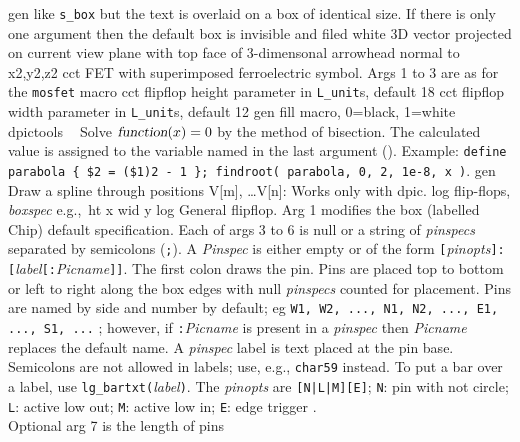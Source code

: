 %

%
  {gen}%
  {like {\tt s\_box} but the text is overlaid on a box of identical size.
   If there is only one argument then the default box
   is invisible and filed white
    }%
%
  {3D}%
  {vector projected on current view plane with top face
   of 3-dimensonal arrowhead normal to x2,y2,z2 }%
%
  {cct}%
  {FET with superimposed ferroelectric symbol. Args 1 to 3 are as for
   the {\tt mosfet} macro
    }%
%
  {cct}%
  {flipflop height parameter in {\tt L\_unit}s, default 18}%
%
  {cct}%
  {flipflop width parameter in {\tt L\_unit}s, default 12}%
%
  {gen}%
  {fill macro, 0=black, 1=white}%
%
  {dpictools}%
  {$\;\;$ Solve $\hbox{\sl function}(x) = 0$ by the method of 
   bisection.  The calculated value is assigned to the variable named in the
   last argument (). Example:
   {\tt define parabola \{ \$2 = (\$1)2 - 1 \};
   findroot( parabola, 0, 2, 1e-8, x )}. }%
%
  {gen}%
  {Draw a spline through positions V[m], \ldots V[n]: Works only with dpic.}%
%
  {log}%
  {flip-flops,
  {\sl boxspec} e.g.,\ ht x wid y }%
%
  {log}%
  {General flipflop.
   Arg 1 modifies the box (labelled Chip) default specification.
   Each of args 3 to 6 is null or a string of {\sl pinspecs}
   separated by semicolons ({\tt;}).  A {\sl Pinspec} is either empty
   or of the form
   {\tt[}{\sl pinopts}{\tt]:[}{\sl label}{\tt[:}{\sl Picname}{\tt]]}.
   The first colon draws the pin.
   Pins are placed top to bottom or left to right along the box edges with
   null {\sl pinspecs} counted for placement. Pins are named by side and number
   by default; eg {\tt W1, W2, ..., N1, N2, ..., E1, ..., S1, ...} ; however,
   if {\tt:}{\sl Picname} is present in a {\sl pinspec} then {\sl Picname}
   replaces the default name.
   A {\sl pinspec} label is text placed at the pin base. Semicolons are
   not allowed in labels; use, e.g., {\tt {}char59}
   instead.
   To put a bar over a label, use {\tt lg\_bartxt(}{\sl label}{\tt)}.
   The {\sl pinopts} are {\tt[N|L|M][E]};
   {\tt N}: pin with not circle;
   {\tt L}: active low out;
   {\tt M}: active low in;
   {\tt E}: edge trigger .\\
   Optional arg 7 is the length of pins}%

